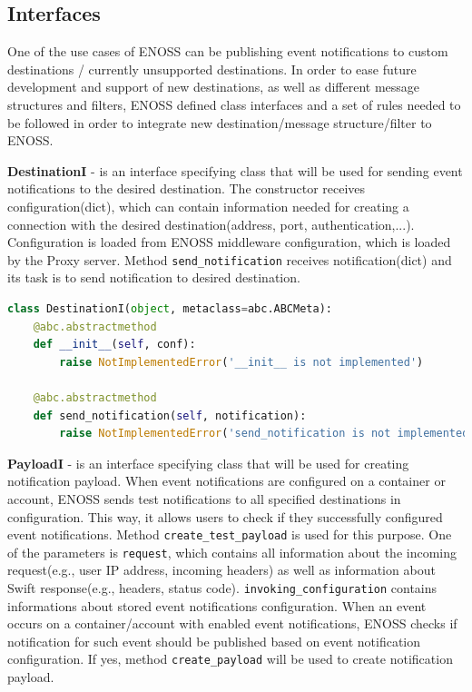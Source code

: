 \documentclass{ExcelAtFIT}
\begin{document}
\subsection{Interfaces}\label{sbs:intefaces}

One of the use cases of ENOSS can be publishing event notifications to custom destinations / currently unsupported destinations. In order to ease future development and support of new destinations, as well as different message structures and filters, ENOSS defined class interfaces and a set of rules needed to be followed in order to integrate new destination/message structure/filter to ENOSS.

\textbf{DestinationI} - is an interface specifying class that will be used for sending event notifications to the desired destination. The constructor receives configuration(dict), which can contain information needed for creating a connection with the desired destination(address, port, authentication,...). Configuration is loaded from ENOSS middleware configuration, which is loaded by the Proxy server. Method \texttt{send\_notification} receives notification(dict) and its task is to send notification to desired destination.

\begin{lstlisting}[language=Python, style=pythonStyle, caption=Interface of class used for sending notification message to desired destination, label=lst:enoss-destinationi]
class DestinationI(object, metaclass=abc.ABCMeta):
    @abc.abstractmethod
    def __init__(self, conf):
        raise NotImplementedError('__init__ is not implemented')

    @abc.abstractmethod
    def send_notification(self, notification):
        raise NotImplementedError('send_notification is not implemented')
\end{lstlisting}

\textbf{PayloadI} - is an interface specifying class that will be used for creating notification payload. When event notifications are configured on a container or account, ENOSS sends test notifications to all specified destinations in configuration. This way, it allows users to check if they successfully configured event notifications. Method \texttt{create\_test\_payload} is used for this purpose. One of the parameters is \texttt{request}, which contains all information about the incoming request(e.g., user IP address, incoming headers) as well as information about Swift response(e.g., headers, status code). \texttt{invoking\_configuration} contains informations about stored event notifications configuration. When an event occurs on a container/account with enabled event notifications, ENOSS checks if notification for such event should be published based on event notification configuration. If yes, method \texttt{create\_payload} will be used to create notification payload.
\end{document}
